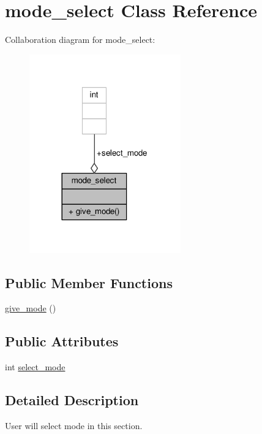 \hypertarget{classmode__select}{}\section{mode\+\_\+select Class Reference}
\label{classmode__select}


Collaboration diagram for mode\+\_\+select\+:
\nopagebreak
\begin{figure}[H]
\begin{center}
\leavevmode
\includegraphics[width=185pt]{classmode__select__coll__graph}
\end{center}
\end{figure}
\subsection*{Public Member Functions}
\begin{DoxyCompactItemize}
\item 
\hyperlink{classmode__select_ad2fbf5488edaa41ff5ab4cbf85e6457a}{give\+\_\+mode} ()
\end{DoxyCompactItemize}
\subsection*{Public Attributes}
\begin{DoxyCompactItemize}
\item 
int \hyperlink{classmode__select_a81b7b37bc5dd126aae4ac9a08270d13a}{select\+\_\+mode}
\end{DoxyCompactItemize}


\subsection{Detailed Description}
User will select mode in this section. 

